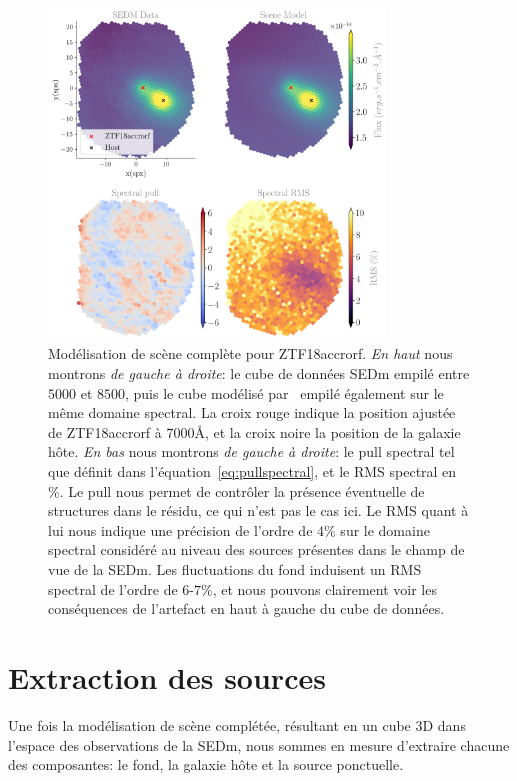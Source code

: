 \documentclass[../main/main.tex]{subfiles}
\begin{document}
\begin{figure}
  \centering
  \includegraphics[width=0.8\textwidth]{../figures/07_scene/scene_rmspull_ZTF18accrorf.png}
  \caption[Modélisation de scène complète pour
  ZTF18accrorf.]{Modélisation de scène complète pour
    ZTF18accrorf. \emph{En haut} nous montrons \emph{de gauche à droite}:
  le cube de données SEDm empilé entre $5000$ et $8500$, puis le cube
  modélisé par \hypergal\ empilé également sur le même domaine
  spectral. La croix rouge indique la position ajustée de ZTF18accrorf à
$7000$\AA, et la croix noire la position de la galaxie hôte. \emph{En
  bas} nous montrons \emph{de gauche à droite}: le pull spectral tel que
définit dans l'équation~\ref{eq:pullspectral}, et le RMS spectral en
\%. Le pull nous permet de contrôler la présence éventuelle de structures dans le
résidu, ce qui n'est pas le cas ici. Le RMS quant à lui nous indique une
précision de l'ordre de $4\%$ sur le domaine spectral considéré au
niveau des sources présentes dans le champ de vue de la SEDm. Les
fluctuations du fond induisent un RMS spectral de l'ordre de $6$-$7\%$,
et nous pouvons clairement voir les conséquences de l'artefact en haut à
gauche du cube de données.}
  \label{fig:fullsceneZTF18accrorf}
\end{figure}

\section{Extraction des sources}

Une fois la modélisation de scène complétée, résultant en
un cube 3D dans l'espace des observations de la SEDm, nous sommes en mesure
d'extraire chacune des composantes: le fond, la galaxie hôte et la source
ponctuelle. 
\end{document}
